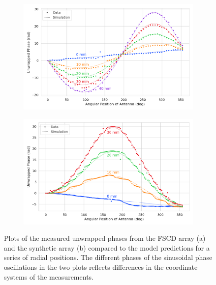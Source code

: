 \begin{figure}[htbp]
\centering
\begin{subfigure}{.7\textwidth}
  \centering
  \includegraphics[width=1\textwidth]{figs/Chapter-5/230411_jugaad_measured_phases_z0.png}
  \caption{}
  \label{fig:jugaad_phase}
\end{subfigure}
\par\medskip %
\begin{subfigure}{.7\textwidth}
  \centering
  \includegraphics[width=1\textwidth]{figs/Chapter-5/230411_synthetic_array_measured_phases_z0.png}
  \caption{}
  \label{fig:synth_jugaad_phase}
\end{subfigure}
\caption{Plots of the measured unwrapped phases from the FSCD array (a) and the synthetic array (b) compared to the model predictions for a series of radial positions. The different phases of the sinusoidal phase oscillations in the two plots reflects differences in the coordinate systems of the measurements.}
\label{fig:jugaad_measured_phases}
\end{figure}

